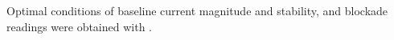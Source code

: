 \documentclass[journal=langd5,manuscript=article]{achemso}
\begin{document}
  
  
  
 
 
 


Optimal conditions of baseline current magnitude and  stability, and blockade readings  were obtained with 
 .
 
 
 

 

\end{document}
